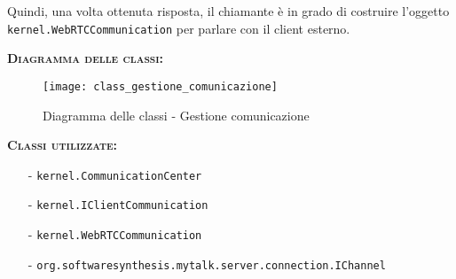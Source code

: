 \begin{description}
\begin{description}
Quindi, una volta ottenuta risposta, il chiamante è in grado di costruire l'oggetto \texttt{kernel.WebRTCCommunication} per parlare con il client esterno.
\end{description}

	\item{\scshape\bfseries Diagramma delle classi:}
  \begin{figure}[H]
    \centering
    \texttt{[image: class\_gestione\_comunicazione]}
    \caption{Diagramma delle classi - Gestione comunicazione}\label{fig:gestionecomunicazione}
  \end{figure}

	\item{\scshape\bfseries Classi utilizzate:} 
	\begin{itemize}[noitemsep,nolistsep]
		\item[-] \texttt{kernel.CommunicationCenter}
		\item[-] \texttt{kernel.IClientCommunication}
		\item[-] \texttt{kernel.WebRTCCommunication}
		\item[-] \texttt{org.softwaresynthesis.mytalk.server.connection.IChannel}
	\end{itemize}  
\end{description}

